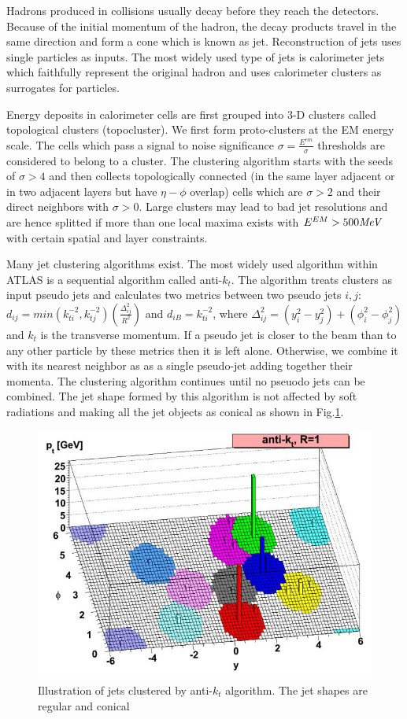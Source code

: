 \label{sec:reco-jets}
Hadrons produced in collisions usually decay before they reach the detectors. Because of the initial momentum of the hadron, the decay products travel in the same direction and form a cone which is known as jet. Reconstruction of jets uses single particles as inputs. The most widely used type of jets is calorimeter jets which faithfully represent the original hadron and uses calorimeter clusters as surrogates for particles.

Energy deposits in calorimeter cells are first grouped into 3-D clusters called topological clusters (topocluster)\cite{PERF-2014-07}. We first form proto-clusters at the EM energy scale. The cells which pass a signal to noise significance $\sigma=\frac{E^{em}}{\sigma}$ thresholds are considered to belong to a cluster. The clustering algorithm starts with the seeds of $\sigma>4$ and then collects topologically connected (in the same layer adjacent or in two adjacent layers but have $\eta- \phi$ overlap) cells which are $\sigma>2$ and their direct neighbors with $\sigma>0$. Large clusters may lead to bad jet resolutions and are hence splitted if more than one local maxima exists with $E^{EM}>500 \textit{MeV}$ with certain spatial and layer constraints.

Many jet clustering algorithms exist. The most widely used algorithm within ATLAS is a sequential algorithm called anti-$k_t$\cite{Cacciari:2008gp}. The algorithm treats clusters as input pseudo jets and calculates two metrics between two pseudo jets $i,j$: $d_{ij}=min(k^{-2}_{ti},k^{-2}_{tj})(\frac{\Delta^2_{ij}}{R^2})$ and $d_{iB}=k^{-2}_{ti}$, where $\Delta^2_{ij}=(y_i^2-y_j^2)+(\phi_i^2-\phi_j^2)$ and $k_t$ is the transverse momentum. If a pseudo jet is closer to the beam than to any other particle by these metrics then it is left alone. Otherwise, we combine it with its nearest neighbor as as a single pseudo-jet adding together their momenta. The clustering algorithm continues until no pseuodo jets can be combined. The jet shape formed by this algorithm is not affected by soft radiations and making all the jet objects as conical as shown in Fig.\ref{fig:reco-antikt}. 

\begin{figure}[htpb!]
\begin{center}
  \includegraphics[width=0.55\linewidth]{figures/Reco/Antikt}
\caption{Illustration of jets clustered by anti-$k_t$ algorithm. The jet shapes are regular and conical}
\label{fig:reco-antikt}
\end{center}
\end{figure}

